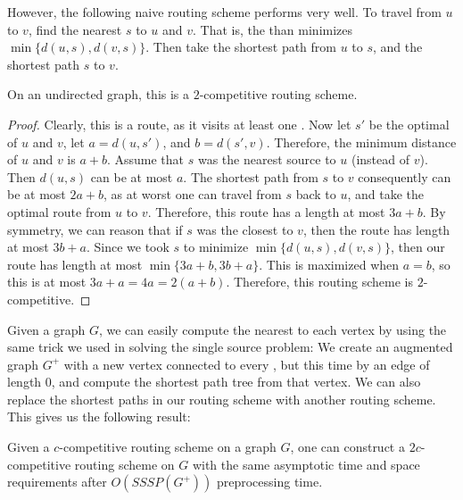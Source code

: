 \documentclass{cccg13}
\begin{document}
However, the following naive routing scheme performs very well. To travel from $u$ to $v$, find the nearest \supplier{} $s$ to $u$ and $v$. That is, the \supplier{} than minimizes $\min\{d(u,s), d(v,s)\}$. Then take the shortest path from $u$ to $s$, and the shortest path $s$ to $v$.

\begin{lemma}
    On an undirected graph, this is a $2$-competitive \supplied{} routing scheme.
\end{lemma}

\begin{proof}
    Clearly, this is a \supplied{} route, as it visits at least one \supplier{}. Now let $s'$ be the optimal \supplier{} of $u$ and $v$, let $a = d(u,s')$, and $b = d(s',v)$. Therefore, the minimum \supplied{} distance of $u$ and $v$ is $a + b$. Assume that $s$ was the nearest source to $u$ (instead of $v$). Then $d(u,s)$ can be at most $a$. The shortest path from $s$ to $v$ consequently can be at most $2a + b$, as at worst one can travel from $s$ back to $u$, and take the optimal \supplied{} route from $u$ to $v$. Therefore, this route has a length at most $3a + b$. By symmetry, we can reason that if $s$ was the closest \supplier{} to $v$, then the route has length at most $3b + a$. Since we took $s$ to minimize $\min\{d(u,s), d(v,s)\}$, then our route has length at most $\min\{3a + b, 3b + a\}$. This is maximized when $a = b$, so this is at most $3a + a = 4a = 2(a + b)$. Therefore, this routing scheme is $2$-competitive.
\end{proof}

Given a graph $G$, we can easily compute the nearest \supplier{} to each vertex by using the same trick we used in solving the single source problem: We create an augmented graph $G^+$ with a new vertex connected to every \supplier{}, but this time by an edge of length $0$, and compute the shortest path tree from that vertex. We can also replace the shortest paths in our routing scheme with another routing scheme. This gives us the following result: 

\begin{theorem}
    Given a $c$-competitive routing scheme on a graph $G$, one can construct a $2c$-competitive \supplied{} routing scheme on $G$ with the same asymptotic time and space requirements after $O(SSSP(G^+))$ preprocessing time.
\end{theorem}

%   

\small 


\end{document}
